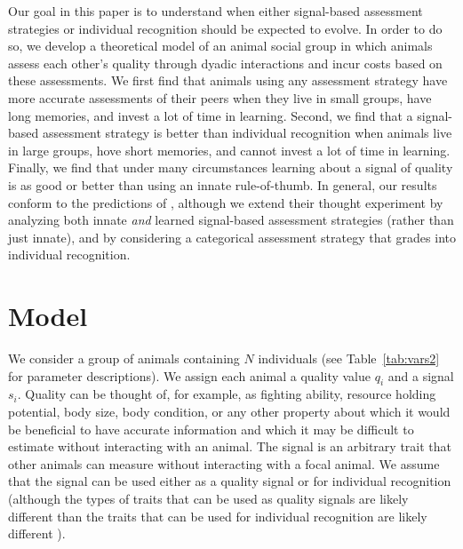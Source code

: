 Our goal in this paper is to understand when either signal-based assessment strategies or individual recognition should be expected to evolve.  In order to do so, we develop a theoretical model of an animal social group in which animals assess each other's quality through dyadic interactions and incur costs based on these assessments. We first find that animals using any assessment strategy have more accurate assessments of their peers when they live in small groups, have long memories, and invest a lot of time in learning. Second, we find that a signal-based assessment strategy is better than individual recognition when animals live in large groups, hove short memories, and cannot invest a lot of time in learning. Finally, we find that under many circumstances learning about a signal of quality is as good or better than using an innate rule-of-thumb. In general, our results conform to the predictions of \citet{sheehan2016evotradeoff}, although we extend their thought experiment by analyzing both innate \emph{and} learned signal-based assessment strategies (rather than just innate), and by considering a categorical assessment strategy that grades into individual recognition. 
 

\section*{Model } 

We consider a group of animals containing $N$ individuals (see Table~\ref{tab:vars2} for parameter descriptions). We assign each animal a quality value $q_i$ and a signal $s_i$. Quality can be thought of, for example, as fighting ability, resource holding potential, body size, body condition, or any other property about which it would be beneficial to have accurate information and which it may be difficult to estimate without interacting with an animal. The signal is an arbitrary trait that other animals can measure without interacting with a focal animal.  We assume that the signal can be used either as a quality signal or for individual recognition (although the types of traits that can be used  as quality signals are likely different than the traits that can be used for individual recognition are likely different \citep{Dale:2001dv}).

